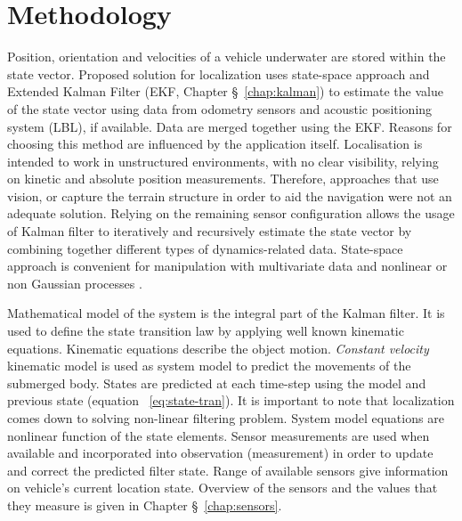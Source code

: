 \chapter{Methodology} \label{chap:methodology}
Position, orientation and velocities of a vehicle underwater are stored within the state vector. Proposed solution for localization uses state-space approach and Extended Kalman Filter (EKF, Chapter \S~\ref{chap:kalman}) to estimate the value of the state vector using data from odometry sensors and acoustic positioning system (LBL), if available. Data are merged together using the EKF. Reasons for choosing this method are influenced by the application itself. Localisation is intended to work in unstructured environments, with no clear visibility, relying on kinetic and absolute position measurements. Therefore, approaches that use vision, or capture the terrain structure in order to aid the navigation were not an adequate solution. Relying on the remaining sensor configuration allows the usage of Kalman filter to iteratively and recursively estimate the state vector by combining together different types of dynamics-related data. State-space approach is convenient for manipulation with multivariate data and nonlinear or non Gaussian processes \cite{ristic04}. 

Mathematical model of the system is the integral part of the Kalman filter. It is used to define the state transition law by applying well known kinematic equations.  Kinematic equations describe the object motion. \textit{Constant velocity} kinematic model is used as system model to predict the movements of the submerged body. States are predicted at each time-step using the model and previous state (equation ~\ref{eq:state-tran}). It is important to note that localization comes down to solving non-linear filtering problem. System model equations are nonlinear function of the state elements. Sensor measurements are used when available and incorporated into observation (measurement) in order to update and correct the predicted filter state. Range of available sensors give information on vehicle's current location state. Overview of the sensors and the values that they measure is given in Chapter \S~\ref{chap:sensors}.
